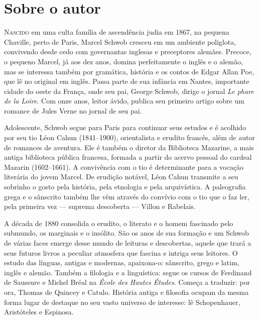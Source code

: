 
\section{Sobre o autor}

\noindent\textsc{Nascido} em uma culta família de ascendência judia em 1867, na pequena
Chaville, perto de Paris, Marcel Schwob cresceu em um ambiente poliglota,
convivendo desde cedo com governantas inglesas e preceptores alemães. Precoce,
o pequeno Marcel, já aos dez anos, domina perfeitamente o inglês e o alemão,
mas se interessa também por gramática, história e os contos de Edgar Allan Poe,
que lê no original em inglês. Passa parte de sua infância em Nantes,
importante cidade do oeste da França, onde seu pai, George Schwob, dirige o
jornal \textit{Le phare de la Loire}. Com onze anos, leitor ávido, publica seu
primeiro artigo sobre um romance de Jules Verne no jornal de seu pai.

Adolescente, Schwob segue para Paris para continuar seus estudos e é
acolhido por seu tio Léon Cahun (1841--1900), orientalista e erudito francês,
além de autor de romances de aventura. Ele é também o diretor da Biblioteca
Mazarine, a mais antiga biblioteca pública francesa, formada a partir do acervo
pessoal do cardeal Mazarin (1602--1661). A convivência com o tio é determinante
para a vocação literária do jovem Marcel. De erudição notável, Léon Cahun
transmite a seu sobrinho o gosto pela história, pela etnologia e pela
arquivística. A paleografia grega e o sânscrito também lhe vêm através do
convívio com o tio que o faz ler, pela primeira vez --- suprema descoberta --- Villon e Rabelais.

A década de 1880 consolida o erudito, o literato e o homem fascinado pelo
submundo, os marginais e o insólito. São os anos de sua formação e um Schwob de
várias faces emerge desse mundo de leituras e descobertas, aquele que trará a
seus futuros livros a peculiar atmosfera que fascina e intriga seus leitores. O
estudo das línguas, antigas e modernas, apaixona-o: sânscrito, grego e latim,
inglês e alemão. Também a filologia e a linguística: segue os cursos de
Ferdinand de Saussure e Michel Bréal na \textit{École des Hautes Études}.
Começa a traduzir: por ora, Thomas de Quincey e Catulo. História antiga e
filosofia ocupam da mesma forma lugar de destaque no seu vasto universo de
interesse: lê Schopenhauer, Aristóteles e Espinosa.


